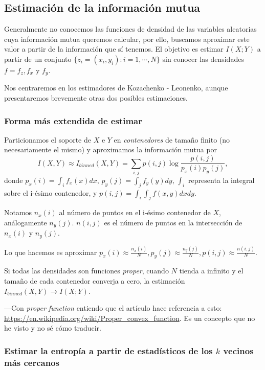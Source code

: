 \documentclass[10pt,a4paper]{article} %
\theoremstyle{definition}
\begin{document}
\subsection{Estimación de la información mutua}

Generalmente no conocemos las funciones de densidad de las variables aleatorias cuya información mutua queremos calcular, por ello, buscamos aproximar este valor a partir de la información que sí tenemos. El objetivo es estimar $I(X;Y)$ a partir de un conjunto $\{z_i=(x_i,y_i) : i = 1,\cdots, N\}$ sin conocer las densidades $f=f_z, f_x$ y $f_y$.

Nos centraremos en los estimadores de Kozachenko - Leonenko, aunque presentaremos brevemente otras dos posibles estimaciones.

\subsubsection{Forma más extendida de estimar}

Particionamos el soporte de $X$ e $Y$ en \textit{contenedores} de tamaño finito (no necesariamente el mismo) y aproximamos la información mutua por \[
I(X,Y) \approx I_{\textit{binned}}(X,Y) = \sum_{i,j} p(i,j) \log \frac{p(i,j)}{p_x(i)p_y(j)},
\]
donde $p_x(i) = \int_i f_x(x)dx$, $p_y(j) = \int_j f_y(y)dy$, $\int_i$ representa la integral sobre el i-ésimo contenedor, y $p(i,j) = \int_i\int_jf(x,y)dxdy$.

Notamos $n_x(i)$ al número de puntos en el i-ésimo contenedor de $X$, análogamente $n_y(j)$. $n(i,j)$ es el número de puntos en la intersección de $n_x(i)$ y $n_y(j)$.

Lo que hacemos es aproximar $p_x(i) \approx \frac{n_x(i)}{N}, p_y(j) \approx \frac{n_y(j)}{N}, p(i,j) \approx \frac{n(i,j)}{N}$.

Si todas las densidades son funciones \textit{proper}, cuando $N$ tienda a infinito y el tamaño de cada contenedor converja a cero, la estimación $I_{\textit{binned}}(X,Y) \to I(X;Y)$.

---Con \textit{proper function} entiendo que el artículo hace referencia a esto: \url{https://en.wikipedia.org/wiki/Proper\_convex\_function}. Es un concepto que no he visto y no sé cómo traducir.

\subsubsection{Estimar la entropía a partir de estadísticos de los $k$ vecinos más cercanos}
\end{document}
